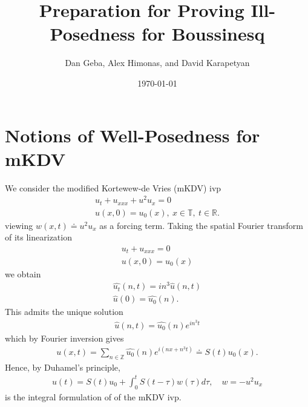 \documentclass[12pt,reqno]{amsart}
\numberwithin{equation}{section}  %
\newcommand{\rr}{\mathbb{R}}
\newcommand{\zz}{\mathbb{Z}}
\newcommand{\ci}{\mathbb{T}}
\newcommand{\wh}{\widehat}
\begin{document}
\title{Preparation for Proving Ill-Posedness for Boussinesq}
\author{Dan Geba, Alex Himonas, and David Karapetyan}
\address{Department of Mathematics  \\
    University  of Notre Dame\\
        Notre Dame, IN 46556 }
        \date{\today}
        \maketitle
        \tableofcontents
\section{Notions of Well-Posedness for mKDV}
        We consider the modified 
        Kortewew-de Vries (mKDV) ivp
        \begin{gather}
          \label{mkdv}
          u_{t} + u_{xxx} + u^{2} u_{x} = 0
          \\
          u(x,0) = u_{0}(x), \ x \in \ci, \ t \in \rr.
          \label{mkdv-init}
        \end{gather}
        viewing $w(x,t) \doteq u^{2} u_{x}$ as a forcing term.
        Taking the spatial Fourier transform of its linearization
        \begin{gather*}
          \label{lin-mkdv}
          u_{t} + u_{xxx} =0
          \\
          u(x,0) = u_{0}(x)
          \label{lin-mkdv-init}
        \end{gather*}
 we obtain
 \begin{equation*}
 \begin{split}
   \wh{u_{t}}(n, t) =  i n^{3}\wh{u}(n,t) 
   \\
   \wh{u}(0) = \wh{u_{0}}(n).
 \end{split}
 \end{equation*}
 This admits the unique solution
 \begin{equation*}
 \begin{split}
   \wh{u}(n,t) = \wh{u_{0}}(n) e^{i n^{3}t}
 \end{split}
 \end{equation*}
 which by Fourier inversion gives
 \begin{equation*}
 \begin{split}
   u(x,t) = \sum_{n \in \zz} \wh{u_{0}}(n) e^{i\left( nx + n^{3}t \right)} \doteq S(t)u_{0}(x).  \end{split}
 \end{equation*}
Hence, by Duhamel's principle, 
%
%
\begin{equation}
  \label{int-reform-mkdv}
\begin{split}
  u(t) = S(t)u_{0} + \int_{0}^{t} S(t- \tau) w(\tau) d \tau, \quad w =
  -u^{2}u_{x}
\end{split}
\end{equation}
%
%
is the integral formulation of of the mKDV ivp. 
\end{document}
